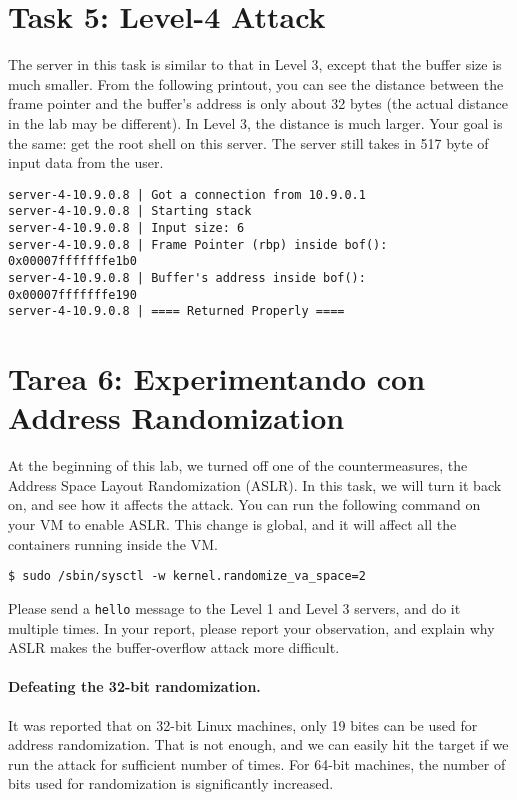 \section{Task 5: Level-4 Attack} 

The server in this task is similar to that in Level 3, 
except that the buffer size is much smaller. From the 
following printout, you can see the distance between 
the frame pointer and the buffer's address is only about 32 bytes (the 
actual distance in the lab may be different).
In Level 3, the distance is much larger. Your goal is the same: 
get the root shell on this server. The server still takes in
517 byte of input data from the user.


\begin{lstlisting}
server-4-10.9.0.8 | Got a connection from 10.9.0.1
server-4-10.9.0.8 | Starting stack
server-4-10.9.0.8 | Input size: 6
server-4-10.9.0.8 | Frame Pointer (rbp) inside bof():  0x00007fffffffe1b0
server-4-10.9.0.8 | Buffer's address inside bof():     0x00007fffffffe190
server-4-10.9.0.8 | ==== Returned Properly ====
\end{lstlisting}
 

\section{Tarea 6: Experimentando con Address Randomization}

At the beginning of this lab, we turned off one of the countermeasures,
the Address Space Layout Randomization (ASLR). In this task, we will turn
it back on, and see how it affects the attack. You can run 
the following command on your VM to enable ASLR. This change is global, and 
it will affect all the containers running inside the VM.


\begin{lstlisting}
$ sudo /sbin/sysctl -w kernel.randomize_va_space=2
\end{lstlisting}

Please send a \texttt{hello} message to the Level 1 and Level 3 servers,
and do it multiple times.
In your report, please report your observation, and explain why
ASLR makes the buffer-overflow attack more difficult. 


\paragraph{Defeating the 32-bit randomization.}
It was reported that on 32-bit Linux machines, only 19 bites can be used 
for address randomization.
That is not enough, and we can easily hit the target 
if we run the attack for sufficient number of times. For 64-bit 
machines, the number of bits used for randomization is 
significantly increased. 

